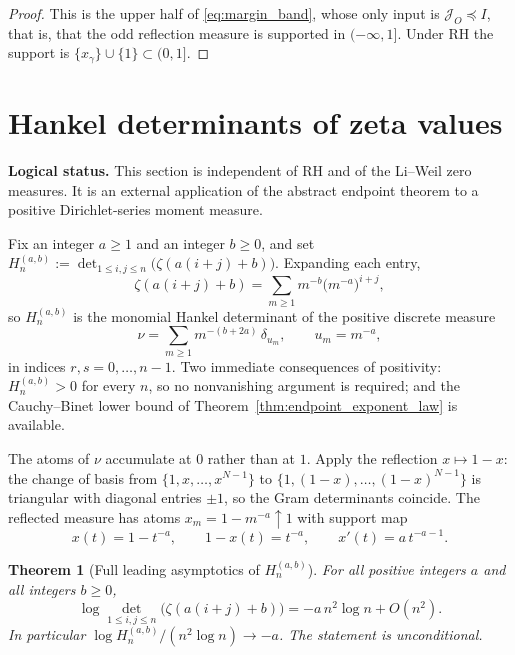 \documentclass[preprint,12pt]{elsarticle}
\numberwithin{equation}{section}
\theoremstyle{plain}
\newtheorem{theorem}{Theorem}[section]
\theoremstyle{definition}
\theoremstyle{remark}
\newcommand{\RH}{\mathrm{RH}}
\begin{document}
\begin{proof}
This is the upper half of \eqref{eq:margin_band}, whose only input is $\mathcal J_O\preceq I$,
that is, that the odd reflection measure is supported in $(-\infty,1]$.  Under $\RH$ the
support is $\{x_\gamma\}\cup\{1\}\subset(0,1]$.
\end{proof}
\section{Hankel determinants of zeta values}
\label{sec:zeta}

\noindent\textbf{Logical status.}\quad
This section is independent of \(\RH\) and of the Li--Weil zero measures.  It is an external
application of the abstract endpoint theorem to a positive Dirichlet-series moment measure.

Fix an integer \(a\ge1\) and an integer \(b\ge0\), and set
$H_{n}^{(a,b)}:=\det_{1\le i,j\le n}\bigl(\zeta(a(i+j)+b)\bigr)$. Expanding each entry,
\begin{equation}
\zeta(a(i+j)+b)=\sum_{m\ge1}m^{-b}\bigl(m^{-a}\bigr)^{i+j},
\end{equation}
so $H_{n}^{(a,b)}$ is the monomial Hankel determinant of the positive
discrete measure
\begin{equation}
\nu=\sum_{m\ge1}m^{-(b+2a)}\,\delta_{u_{m}},\qquad u_{m}=m^{-a},
\label{eq:nu}
\end{equation}
in indices $r,s=0,\dots,n-1$. Two immediate consequences of positivity: $H_{n}^{(a,b)}>0$ for every
$n$, so no nonvanishing argument is required; and the Cauchy--Binet lower bound of Theorem~\ref{thm:endpoint_exponent_law} is available.

The atoms of $\nu$ accumulate at $0$ rather than at $1$. Apply the reflection $x\mapsto1-x$: the
change of basis from $\{1,x,\dots,x^{N-1}\}$ to $\{1,(1-x),\dots,(1-x)^{N-1}\}$ is triangular with
diagonal entries $\pm1$, so the Gram determinants coincide. The reflected measure has atoms
$x_{m}=1-m^{-a}\uparrow1$ with support map
\begin{equation}
x(t)=1-t^{-a},\qquad 1-x(t)=t^{-a},\qquad x'(t)=a\,t^{-a-1}.
\end{equation}

\begin{theorem}[Full leading asymptotics of $H_{n}^{(a,b)}$]
\label{thm:zeta}
For all positive integers $a$ and all integers $b\ge0$,
\begin{equation}
\boxed{\ \log\det_{1\le i,j\le n}\bigl(\zeta(a(i+j)+b)\bigr)=-a\,n^{2}\log n+O(n^{2}).\ }
\label{eq:zeta_law}
\end{equation}
In particular $\log H_{n}^{(a,b)}/(n^{2}\log n)\to-a$. The statement is unconditional.
\end{theorem}
\end{document}
